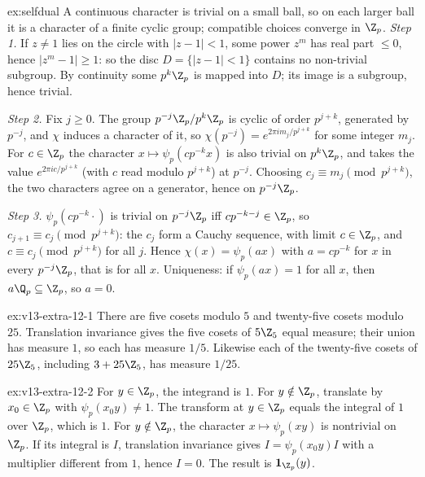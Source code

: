 \begin{solution}{ex:selfdual}
\idea A continuous character is trivial on a small ball, so on each larger ball it is a character of a finite cyclic group; compatible choices converge in $\Z_p$.
\writeup \emph{Step 1.} If $z\ne1$ lies on the circle with $|z-1|<1$, some power $z^m$ has real part $\le0$, hence $|z^m-1|\ge1$: so the disc $D=\{|z-1|<1\}$ contains no
non-trivial subgroup. By continuity some $p^k\Z_p$ is mapped into $D$; its image is a subgroup, hence trivial.

\emph{Step 2.} Fix $j\ge0$. The group $p^{-j}\Z_p/p^k\Z_p$ is cyclic of order $p^{j+k}$, generated by $p^{-j}$, and $\chi$ induces a character of it, so
$\chi(p^{-j})=e^{2\pi im_j/p^{j+k}}$ for some integer $m_j$. For $c\in\Z_p$ the character $x\mapsto\psi_p(cp^{-k}x)$ is also trivial on $p^k\Z_p$, and takes the
value $e^{2\pi ic/p^{j+k}}$ (with $c$ read modulo $p^{j+k}$) at $p^{-j}$. Choosing $c_j\equiv m_j\pmod{p^{j+k}}$, the two characters agree on a generator, hence on
$p^{-j}\Z_p$.

\emph{Step 3.} $\psi_p(cp^{-k}\cdot)$ is trivial on $p^{-j}\Z_p$ iff $cp^{-k-j}\in\Z_p$, so $c_{j+1}\equiv c_j\pmod{p^{j+k}}$: the $c_j$ form a Cauchy sequence, with
limit $c\in\Z_p$, and $c\equiv c_j\pmod{p^{j+k}}$ for all $j$. Hence $\chi(x)=\psi_p(ax)$ with $a=cp^{-k}$ for $x$ in every $p^{-j}\Z_p$, that is for all $x$.
Uniqueness: if $\psi_p(ax)=1$ for all $x$, then $a\Q_p\subseteq\Z_p$, so $a=0$.
\end{solution}

\begin{solution}{ex:v13-extra-12-1}
\idea There are five cosets modulo $5$ and twenty-five cosets modulo $25$.
\writeup Translation invariance gives the five cosets of $5\Z_5$ equal measure; their union has measure $1$, so each has measure $1/5$. Likewise each of the twenty-five cosets of $25\Z_5$, including $3+25\Z_5$, has measure $1/25$.
\end{solution}

\begin{solution}{ex:v13-extra-12-2}
\idea For $y\in\Z_p$, the integrand is $1$. For $y\notin\Z_p$, translate by $x_0\in\Z_p$ with $\psi_p(x_0y)\ne1$.
\writeup The transform at $y\in\Z_p$ equals the integral of $1$ over $\Z_p$, which is $1$. For $y\notin\Z_p$, the character $x\mapsto\psi_p(xy)$ is nontrivial on $\Z_p$. If its integral is $I$, translation invariance gives $I=\psi_p(x_0y)I$ with a multiplier different from $1$, hence $I=0$. The result is $\mathbf1_{\Z_p}(y)$.
\end{solution}

